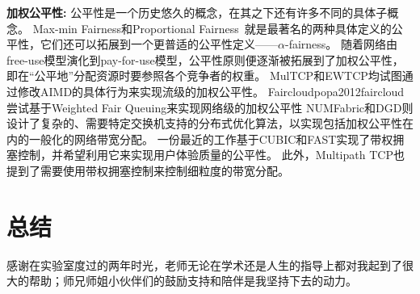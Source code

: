 \documentclass[winfonts]{njuthesis}
\begin{document}
{\bf 加权公平性: }
公平性是一个历史悠久的概念，在其之下还有许多不同的具体子概念。
Max-min Fairness\cite{bertsekas1992data,jaffe1981bottleneck}和Proportional Fairness~\cite{kelly1997charging}就是最著名的两种具体定义的公平性，它们还可以拓展到一个更普适的公平性定义——$\alpha$-fairness\cite{mo2000fair}。
随着网络由free-use模型演化到pay-for-use模型，公平性原则便逐渐被拓展到了加权公平性，即在“公平地”分配资源时要参照各个竞争者的权重。
MulTCP\cite{crowcroft1998differentiated}和EWTCP\cite{Honda2009EWTCP}均试图通过修改AIMD的具体行为来实现流级的加权公平性。
Faircloud{popa2012faircloud}尝试基于Weighted Fair Queuing\cite{demers1989analysis,Abhay1993WFQ}来实现网络级的加权公平性
NUMFabric和DGD则设计了复杂的、需要特定交换机支持的分布式优化算法，以实现包括加权公平性在内的一般化的网络带宽分配。
一份最近的工作\cite{Nathan2019wcubic}基于CUBIC\cite{ha2008cubic}和FAST\cite{chen2004fast}实现了带权拥塞控制，并希望利用它来实现用户体验质量的公平性。
此外，Multipath TCP\cite{wischik2011design,lu2018multi}也提到了需要使用带权拥塞控制来控制细粒度的带宽分配。

\chapter{总结}\label{chapter:conclusion}



\begin{acknowledgement}
感谢在实验室度过的两年时光，老师无论在学术还是人生的指导上都对我起到了很大的帮助；师兄师姐小伙伴们的鼓励支持和陪伴是我坚持下去的动力。
\end{acknowledgement}

\end{document}
